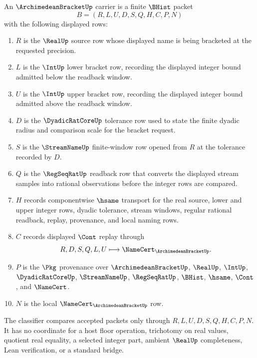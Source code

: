 \begin{definition}
\label{def:archimedean-bracket-carrier}
An $\ArchimedeanBracketUp$ carrier is a finite $\BHist$ packet
$$
B=(R,L,U,D,S,Q,H,C,P,N)
$$
with the following displayed rows:
\begin{enumerate}
\item $R$ is the $\RealUp$ source row whose displayed name is being bracketed at the requested precision.
\item $L$ is the $\IntUp$ lower bracket row, recording the displayed integer bound admitted below the readback window.
\item $U$ is the $\IntUp$ upper bracket row, recording the displayed integer bound admitted above the readback window.
\item $D$ is the $\DyadicRatCoreUp$ tolerance row used to state the finite dyadic radius and comparison scale for the bracket request.
\item $S$ is the $\StreamNameUp$ finite-window row opened from $R$ at the tolerance recorded by $D$.
\item $Q$ is the $\RegSeqRatUp$ readback row that converts the displayed stream samples into rational observations before the integer rows are compared.
\item $H$ records componentwise $\hsame$ transport for the real source, lower and upper integer rows, dyadic tolerance, stream windows, regular rational readback, replay, provenance, and local naming rows.
\item $C$ records displayed $\Cont$ replay through
$$
R,D,S,Q,L,U \longmapsto \NameCert_{\ArchimedeanBracketUp}.
$$
\item $P$ is the $\Pkg$ provenance over $\ArchimedeanBracketUp$, $\RealUp$, $\IntUp$, $\DyadicRatCoreUp$, $\StreamNameUp$, $\RegSeqRatUp$, $\BHist$, $\hsame$, $\Cont$, and $\NameCert$.
\item $N$ is the local $\NameCert_{\ArchimedeanBracketUp}$ row.
\end{enumerate}
The classifier compares accepted packets only through $R,L,U,D,S,Q,H,C,P,N$. It has no coordinate for a host floor operation, trichotomy on real values, quotient real equality, a selected integer part, ambient $\RealUp$ completeness, Lean verification, or a standard bridge.
\end{definition}

